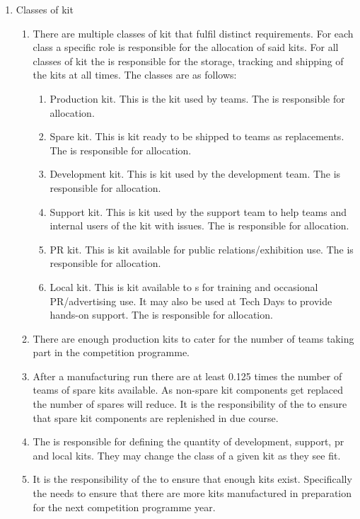 \begin{draft}
\begin{enumerate}
\item Classes of kit
  \begin{enumerate}
    \item There are multiple classes of kit that fulfil distinct requirements. For each class a specific role is responsible for the allocation of said kits. For all classes of kit the  is responsible for the storage, tracking and shipping of the kits at all times. The classes are as follows:
      \begin{enumerate}
        \item Production kit. This is the kit used by teams. The  is responsible for allocation.
        \item Spare kit. This is kit ready to be shipped to teams as replacements. The  is responsible for allocation.
        \item Development kit. This is kit used by the development team.  The  is responsible for allocation.
        \item Support kit. This is kit used by the support team to help teams and internal users of the kit with issues. The  is responsible for allocation.
        \item PR kit. This is kit available for public relations/exhibition use. The  is responsible for allocation.
        \item Local kit. This is kit available to s for training and occasional PR/advertising use. It may also be used at Tech Days to provide hands-on support. The  is responsible for allocation.
      \end{enumerate}
    \item There are enough production kits to cater for the number of teams taking part in the competition programme.
    \item After a manufacturing run there are at least 0.125 times the number of teams of spare kits available. As non-spare kit components get replaced the number of spares will reduce. It is the responsibility of the  to ensure that spare kit components are replenished in due course.
    \item The  is responsible for defining the quantity of development, support, pr and local kits. They may change the class of a given kit as they see fit.
    \item It is the responsibility of the  to ensure that enough kits exist. Specifically the  needs to ensure that there are more kits manufactured in preparation for the next competition programme year.
  \end{enumerate}
\end{enumerate}
\end{draft}
